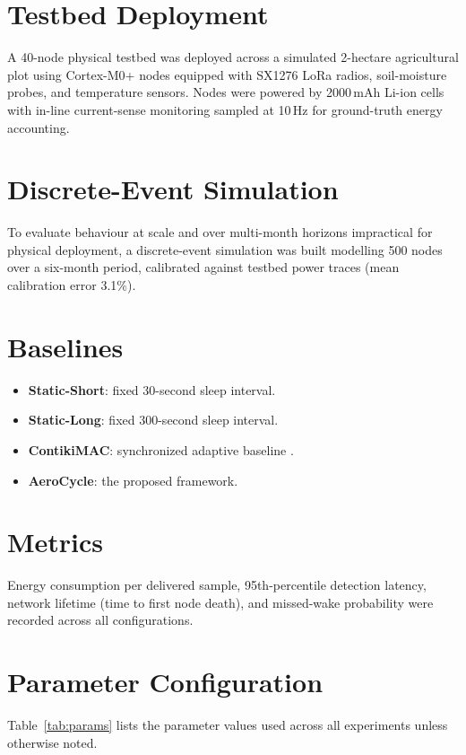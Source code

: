 \documentclass[12pt,a4paper]{report}
\begin{document}
\section{Testbed Deployment}
A 40-node physical testbed was deployed across a simulated 2-hectare agricultural plot using
Cortex-M0+ nodes equipped with SX1276 LoRa radios, soil-moisture probes, and temperature
sensors. Nodes were powered by 2000\,mAh Li-ion cells with in-line current-sense monitoring
sampled at 10\,Hz for ground-truth energy accounting.

\section{Discrete-Event Simulation}
To evaluate behaviour at scale and over multi-month horizons impractical for physical
deployment, a discrete-event simulation was built modelling 500 nodes over a six-month
period, calibrated against testbed power traces (mean calibration error 3.1\%).

\section{Baselines}
\begin{itemize}[leftmargin=1.4em]
  \item \textbf{Static-Short}: fixed 30-second sleep interval.
  \item \textbf{Static-Long}: fixed 300-second sleep interval.
  \item \textbf{ContikiMAC}: synchronized adaptive baseline \cite{ye2004smac}.
  \item \textbf{AeroCycle}: the proposed framework.
\end{itemize}

\section{Metrics}
Energy consumption per delivered sample, 95th-percentile detection latency, network lifetime
(time to first node death), and missed-wake probability were recorded across all
configurations.

\section{Parameter Configuration}
Table~\ref{tab:params} lists the parameter values used across all experiments unless
otherwise noted.
\end{document}
